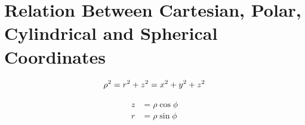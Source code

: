 \chapter{Relation Between Cartesian, Polar, Cylindrical and Spherical
Coordinates}
\label{chap:relation-between-cartesian-polar-cylindrical-and-spherical-coordinates}

\begin{equation}
  \label{eqn:cart-cylind-sphere-relation}
  \begin{displaystyle}
    \rho^2 = r^2+z^2 = x^2+y^2+z^2
  \end{displaystyle}
\end{equation}

\begin{equation}
  \label{eqn:cylin-sphere-relation}
  \begin{aligned}
    z &= \rho \cos \phi \\
    r &= \rho \sin \phi
  \end{aligned}
\end{equation}
